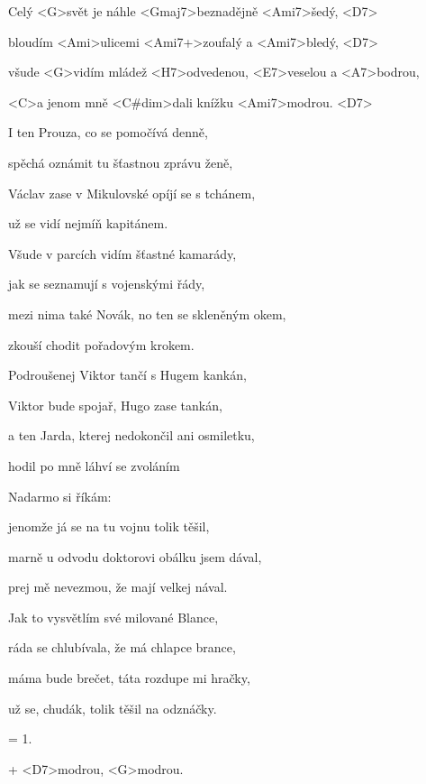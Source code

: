 

\zs
Celý <G>svět je náhle <Gmaj7>beznadějně <Ami7>šedý, <D7>

bloudím <Ami>ulicemi <Ami7+>zoufalý a <Ami7>bledý, <D7>

všude <G>vidím mládež <H7>odvedenou, <E7>veselou a <A7>bodrou,

<C>a jenom mně <C#dim>dali knížku <Ami7>modrou. <D7>
\ks

\zs
I ten Prouza, co se pomočívá denně,

spěchá oznámit tu šťastnou zprávu ženě,

Václav zase v Mikulovské opíjí se s tchánem,

už se vidí nejmíň kapitánem.
\ks

\zs
Všude v parcích vidím šťastné kamarády,

jak se seznamují s vojenskými řády,

mezi nima také Novák, no ten se skleněným okem,

zkouší chodit pořadovým krokem.
\ks

\zs
Podroušenej Viktor tančí s Hugem kankán,

Viktor bude spojař, Hugo zase tankán,

a ten Jarda, kterej nedokončil ani osmiletku,

hodil po mně láhví se zvoláním 
\ks

\zs
Nadarmo si říkám: 

jenomže já se na tu vojnu tolik těšil,

marně u odvodu doktorovi obálku jsem dával,

prej mě nevezmou, že mají velkej nával.
\ks

\zs
Jak to vysvětlím své milované Blance,

ráda se chlubívala, že má chlapce brance,

máma bude brečet, táta rozdupe mi hračky,

už se, chudák, tolik těšil na odznáčky.
\ks

\zs
= 1.

+ <D7>modrou, <G>modrou.
\ks

\kp
